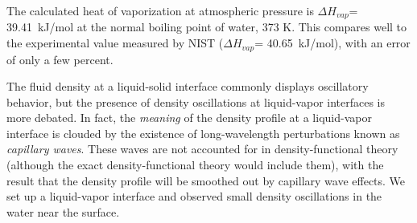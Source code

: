 \documentclass[letterpaper,twocolumn,amsmath,amssymb,prb]{revtex4-1}
\newcommand{\fixme}[1]{\textcolor{red}{[\emph{#1}]}}
\begin{document}



The calculated heat of vaporization at atmospheric pressure is
$\Delta H_{vap}$= 39.41~kJ/mol at the normal boiling point of water,
373 K. This compares well to the experimental
value measured by NIST ($\Delta H_{vap}$= 40.65~kJ/mol\cite{nistwater}), with 
an error of only a few percent.


The fluid density at a liquid-solid interface commonly displays
oscillatory behavior, but the presence of density oscillations at
liquid-vapor interfaces is more debated\cite{penfold2001structure}.
In fact, the \emph{meaning} of the density profile at a liquid-vapor
interface is clouded by the existence of long-wavelength perturbations
known as \emph{capillary waves}.  These waves are not accounted for in
density-functional theory (although the exact
density-functional theory would include them), with the result
that the density profile will be smoothed out by capillary wave
effects. We set up a liquid-vapor interface and observed small density
oscillations in the water near the surface.
\end{document}
